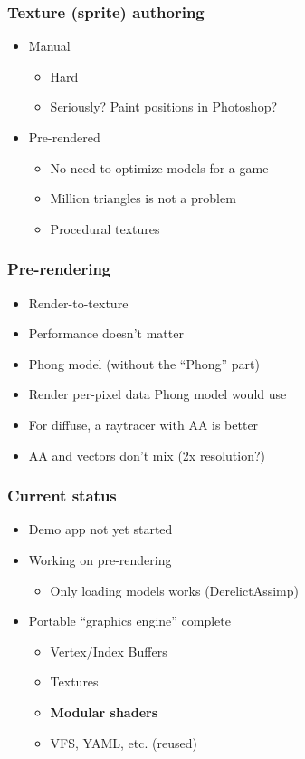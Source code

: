 \documentclass{beamer}
\begin{document}
\begin{frame}\frametitle{Texture (sprite) authoring}

\begin{itemize}
\item
  Manual

  \begin{itemize}
  \item
    Hard
  \item
    Seriously? Paint positions in Photoshop?
  \end{itemize}
\item
  Pre-rendered

  \begin{itemize}
  \item
    No need to optimize models for a game
  \item
    Million triangles is not a problem
  \item
    Procedural textures
  \end{itemize}
\end{itemize}

\end{frame}

\begin{frame}\frametitle{Pre-rendering}

\begin{itemize}
\item
  Render-to-texture
\item
  Performance doesn't matter
\item
  Phong model (without the ``Phong'' part)
\item
  Render per-pixel data Phong model would use
\item
  For diffuse, a raytracer with AA is better
\item
  AA and vectors don't mix (2x resolution?)
\end{itemize}

\end{frame}

\begin{frame}\frametitle{Current status}

\begin{itemize}
\item
  Demo app not yet started
\item
  Working on pre-rendering

  \begin{itemize}
  \item
    Only loading models works (DerelictAssimp)
  \end{itemize}
\item
  Portable ``graphics engine'' complete

  \begin{itemize}
  \item
    Vertex/Index Buffers
  \item
    Textures
  \item
    \textbf{Modular shaders}
  \item
    VFS, YAML, etc. (reused)
  \end{itemize}
\end{itemize}

\end{frame}
\end{document}
